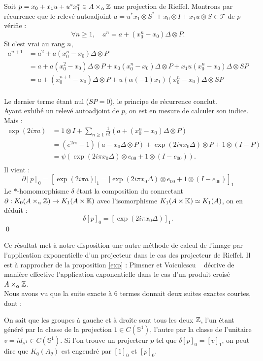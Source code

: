 \begin{dem}
Soit $p=x_0+x_1 u +u^*x_1^*\in A\times_\alpha \mathbb Z $ une projection de Rieffel. Montrons par récurrence que le relevé autoadjoint $a=u^*x_1\otimes S^*+x_0\otimes I +x_1 u\otimes S\in \mathcal T$ de $p$ vérifie :
\[\forall n \geq 1, \quad a^n = a+(x_0^n-x_0)\Delta\otimes P.\]
Si c'est vrai au rang $n$,\\
\begin{align*}
a^{n+1} &=a^2+a(x_0^n-x_0)\Delta\otimes P \\
		& =a+a(x_0^2-x_0)\Delta\otimes P+x_0(x_0^n-x_0)\Delta\otimes P+x_1u(x_0^n-x_0)\Delta\otimes SP \\
		& = a+(x_0^{n+1}-x_0)\Delta\otimes P+ u(\alpha(-1)x_1)(x_0^n-x_0)\Delta\otimes SP\\
\end{align*}

Le dernier terme étant nul ($SP=0$), le principe de récurrence conclut.\\

Ayant exhibé un relevé autoadjoint de $p$, on est en mesure de calculer son indice. Mais :
\begin{align*}
\exp(2i\pi a ) &=1\otimes I+\sum_{n\geq 1}\frac{1}{n!}( a+(x_0^n-x_0)\Delta\otimes P)\\
		& = (e^{2i\pi}-1)(a-x_0\Delta \otimes P)+\exp(2i\pi x_0\Delta)\otimes P + 1\otimes (I-P)\\
		& =\psi\left(\exp(2i\pi x_0\Delta)\otimes e_{00} + 1\otimes (I-e_{00})\right).\\
\end{align*}
Il vient : 
\[\partial [p]_0=\left[\exp(2i\pi a )]_1=[\exp(2i\pi x_0\Delta)\otimes e_{00} + 1\otimes (I-e_{00}) \right]_1\]
Le $*$-homomorphisme $\delta$ étant la composition du connectant $\partial : K_0(A\times_\alpha \mathbb Z)\rightarrow K_1(A\times \mathbb K)$ avec l'isomorphisme $K_1(A\times \mathbb K)\simeq K_1(A)$, on en déduit :
\[\delta[p]_0=[\exp(2i\pi x_0\Delta)]_1.\]
\qed
\end{dem}

Ce résultat met à notre disposition une autre méthode de calcul de l'image par l'application exponentielle d'un projecteur dans le cas des projecteur de Rieffel. Il est à rapprocher de la proposition \ref{exp} : Pimsner et Voiculescu ~\cite{PV} décrive de manière effective l'application exponentielle dans le cas d'un produit croisé $A\times _\alpha \mathbb Z$.\\

Nous avons vu que la suite exacte à $6$ termes donnait deux suites exactes courtes, dont :\\
On sait que les groupes à gauche et à droite sont tous les deux $\mathbb Z$, l'un étant généré par la classe de la projection $1\in C(\mathbb S^1)$, l'autre par la classe de l'unitaire $v=id_{\mathbb S^1}\in  C(\mathbb S^1)$. Si l'on trouve un projecteur $p$ tel que $\delta [p]_0=[v]_1$, on peut dire que $K_0(A_\theta)$ est engendré par $[1]_0$ et $[p]_0$.\\

